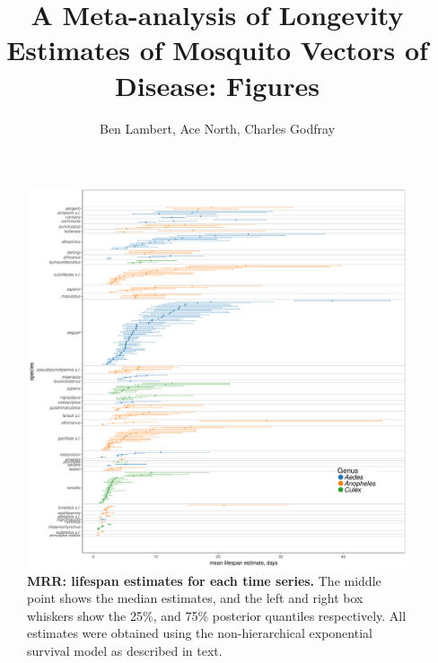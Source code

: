 \documentclass[12pt]{article}
\title{A Meta-analysis of Longevity Estimates of Mosquito Vectors of Disease: Figures}
\author{Ben Lambert, Ace North, Charles Godfray}
\begin{document}
\maketitle

\begin{figure}[h]
	\centerline{\includegraphics[width=1\textwidth]{./Figure_files/mrr_individualEstimates_allSpecies_withoutBalabacensis.pdf}}
	\caption{\textbf{MRR: lifespan estimates for each time series.} The middle point shows the median estimates, and the left and right box whiskers show the 25\%, and 75\% posterior quantiles respectively. All estimates were obtained using the non-hierarchical exponential survival model as described in text.}
	\label{fig:mrr_lifespan_individualEstimates}
\end{figure}
\end{document}
